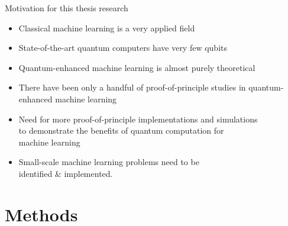 \documentclass[10pt]{beamer}
\begin{document}
{
\begin{frame}[fragile]{Motivation for this thesis research}

\begin{itemize}
\item Classical machine learning is a very applied field
\item State-of-the-art quantum computers have very few qubits
\item Quantum-enhanced machine learning is almost purely theoretical
\item There have been only a handful of proof-of-principle studies in quantum-enhanced machine learning
\item Need for more proof-of-principle implementations and simulations\\ to demonstrate the benefits of quantum computation for\\machine learning
\item Small-scale machine learning problems need to be\\ identified \& implemented.
\end{itemize}

\end{frame}
}

\section{Methods}
\end{document}
